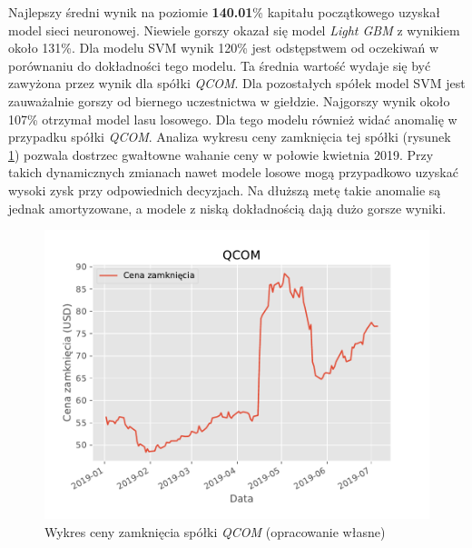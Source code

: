 \documentclass[a4paper, twoside, 11pt, openright]{article}
\begin{document}
Najlepszy średni wynik na poziomie \textbf{140.01}\% kapitału początkowego uzyskał model sieci neuronowej. Niewiele gorszy okazał się model \textit{Light GBM} z wynikiem około 131\%. Dla modelu SVM wynik 120\% jest odstępstwem od oczekiwań w porównaniu do dokładności tego modelu. Ta średnia wartość wydaje się być zawyżona przez wynik dla spółki \textit{QCOM}. Dla pozostałych spółek model SVM jest zauważalnie gorszy od biernego uczestnictwa w giełdzie. Najgorszy wynik około 107\% otrzymał model lasu losowego. Dla tego modelu również widać anomalię w przypadku spółki \textit{QCOM}. Analiza wykresu ceny zamknięcia tej spółki (rysunek \ref{img:qcom_adj_close}) pozwala dostrzec gwałtowne wahanie ceny w połowie kwietnia 2019. Przy takich dynamicznych zmianach nawet modele losowe mogą przypadkowo uzyskać wysoki zysk przy odpowiednich decyzjach. Na dłuższą metę takie anomalie są jednak amortyzowane, a modele z niską dokładnością dają dużo gorsze wyniki.

\begin{figure}[H]
\centering \includegraphics[scale=1]{img/QCOM_adj_close.pdf}
\caption{Wykres ceny zamknięcia spółki \textit{QCOM} (opracowanie własne)}
\label{img:qcom_adj_close}
\end{figure}
\end{document}
